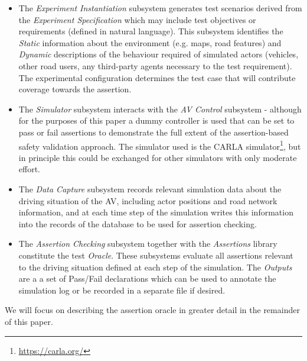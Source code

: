  \begin{itemize}
      \item The \emph{Experiment Instantiation} subsystem generates test scenarios derived from the \emph{Experiment Specification} which may include test objectives or requirements (defined in natural language). This subsystem identifies the \emph{Static} information about the environment (e.g. maps, road features) and \emph{Dynamic} descriptions of the behaviour required of simulated actors (vehicles, other road users, any third-party agents necessary to the test requirement). 
      The experimental configuration determines the test case that will contribute coverage towards the assertion.
      \item The \emph{Simulator} subsystem interacts with the \emph{AV Control} subsystem - although for the purposes of this paper a dummy controller is used that can be set to pass or fail assertions to demonstrate the full extent of the assertion-based safety validation approach. The simulator used is the CARLA simulator\footnote{\url{https://carla.org/}}, but in principle this could be exchanged for other simulators with only moderate effort.
      \item The \emph{Data Capture} subsystem records relevant simulation data about the driving situation of the AV, including actor positions and road network information, and at each time step of the simulation writes this information into the records of the database to be used for assertion checking.
      \item The \emph{Assertion Checking} subsystem together with the \emph{Assertions} library constitute the test \emph{Oracle}. These subsystems evaluate all assertions relevant to the driving situation defined at each step of the simulation. The \emph{Outputs} are a a set of Pass/Fail declarations which can be used to annotate the simulation log or be recorded in a separate file if desired.  
  \end{itemize}
  We will focus on describing the assertion oracle in greater detail in the remainder of this paper.


